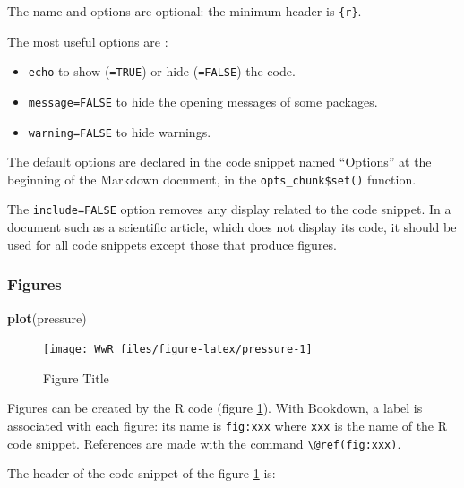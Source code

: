 \documentclass[
  12pt,
  american,
  a4paper,
  extrafontsizes,onecolumn,openright
  ]{memoir}
\newenvironment{Shaded}{\begin{snugshade}}{\end{snugshade}}
\newcommand{\FunctionTok}[1]{\textcolor[rgb]{0.13,0.29,0.53}{\textbf{#1}}}
\newcommand{\NormalTok}[1]{#1}
\providecommand{\tightlist}{%
  \setlength{\itemsep}{0pt}\setlength{\parskip}{0pt}}
\begin{document}
The name and options are optional: the minimum header is \texttt{\{r\}}.

The most useful options are :

\begin{itemize}
\tightlist
\item
  \texttt{echo} to show (\texttt{=TRUE}) or hide (\texttt{=FALSE}) the code.
\item
  \texttt{message=FALSE} to hide the opening messages of some packages.
\item
  \texttt{warning=FALSE} to hide warnings.
\end{itemize}

The default options are declared in the code snippet named \enquote{Options} at the beginning of the Markdown document, in the \texttt{opts\_chunk\$set()} function.

The \texttt{include=FALSE} option removes any display related to the code snippet.
In a document such as a scientific article, which does not display its code, it should be used for all code snippets except those that produce figures.

\subsubsection{Figures}\label{figures}

\scriptsize

\begin{Shaded}
\begin{Highlighting}[]
\FunctionTok{plot}\NormalTok{(pressure)}
\end{Highlighting}
\end{Shaded}

\begin{figure}

{\centering \texttt{[image: WwR\_files/figure-latex/pressure-1]} 

}

\caption{Figure Title}\label{fig:pressure}
\end{figure}

\normalsize

Figures can be created by the R code (figure \ref{fig:pressure}).
With Bookdown, a label is associated with each figure: its name is \texttt{fig:xxx} where \texttt{xxx} is the name of the R code snippet.
References are made with the command \texttt{\textbackslash{}@ref(fig:xxx)}.

The header of the code snippet of the figure \ref{fig:pressure} is:
\end{document}
